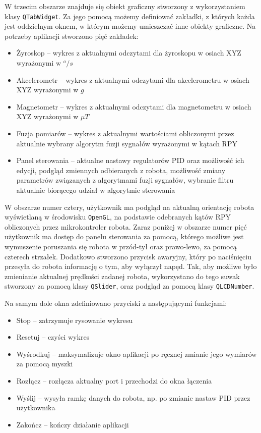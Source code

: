 W trzecim obszarze znajduje się obiekt graficzny stworzony z wykorzystaniem klasy \texttt{QTabWidget}. Za jego pomocą możemy definiować zakładki, z których każda jest oddzielnym oknem, w którym możemy umieszczać inne obiekty graficzne. Na potrzeby aplikacji stworzono pięć zakładek:
\begin{itemize}
    \item Żyroskop -- wykres z aktualnymi odczytami dla żyroskopu w osiach XYZ wyrażonymi w $^o/s$
    \item Akcelerometr -- wykres z aktualnymi odczytami dla akcelerometru w osiach XYZ wyrażonymi w $g$
    \item Magnetometr -- wykres z aktualnymi odczytami dla magnetometru w osiach XYZ wyrażonymi w $\mu T$
    \item Fuzja pomiarów -- wykres z aktualnymi wartościami obliczonymi przez aktualnie wybrany algorytm fuzji sygnałów wyrażonymi w kątach RPY
    \item Panel sterowania -- aktualne nastawy regulatorów PID oraz możliwość ich edycji, podgląd zmiennych odbieranych z robota, możliwość zmiany parametrów związanych z algorytmami fuzji sygnałów, wybranie filtru aktualnie biorącego udział w algorytmie sterowania
\end{itemize}

W obszarze numer cztery, użytkownik ma podgląd na aktualną orientację robota wyświetlaną w środowisku \texttt{OpenGL}, na podstawie odebranych kątów RPY obliczonych przez mikrokontroler robota. Zaraz poniżej w obszarze numer pięć użytkownik ma dostęp do panelu sterowania za pomocą, którego możliwe jest wymuszenie poruszania się robota w przód-tył oraz prawo-lewo, za pomocą czterech strzałek. Dodatkowo stworzono przycisk awaryjny, który po naciśnięciu przesyła do robota informację o tym, aby wyłączył napęd. Tak, aby możliwe było zmienianie aktualnej prędkości zadanej robota, wykorzystano do tego suwak stworzony za pomocą klasy \texttt{QSlider}, oraz podgląd za pomocą klasy \texttt{QLCDNumber}.

Na samym dole okna zdefiniowano przyciski z następującymi funkcjami:
\begin{itemize}
    \item Stop -- zatrzymuje rysowanie wykresu
    \item Resetuj -- czyści wykres
    \item Wyśrodkuj -- maksymalizuje okno aplikacji po ręcznej zmianie jego wymiarów za pomocą myszki
    \item Rozłącz -- rozłącza aktualny port i przechodzi do okna łączenia
    \item Wyślij -- wysyła ramkę danych do robota, np. po zmianie nastaw PID przez użytkownika
    \item Zakończ -- kończy działanie aplikacji
\end{itemize}

